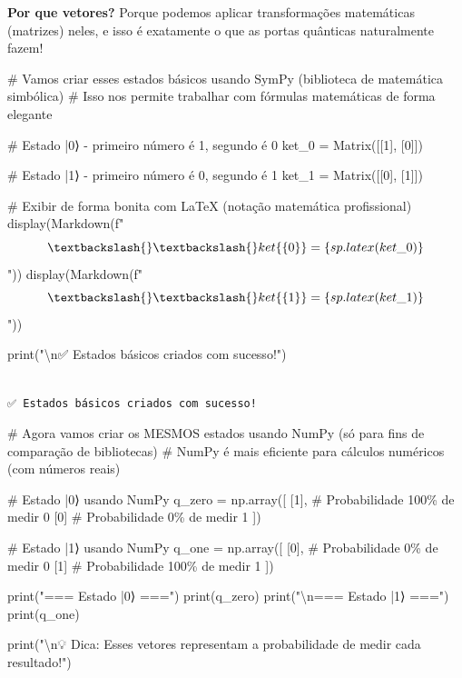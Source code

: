 \documentclass[
  brazilian,
]{report}
\newenvironment{Shaded}{\begin{snugshade}}{\end{snugshade}}
\newcommand{\NormalTok}[1]{\textcolor[rgb]{0.00,0.23,0.31}{#1}}
\begin{document}
\textbf{Por que vetores?} Porque podemos aplicar transformações
matemáticas (matrizes) neles, e isso é exatamente o que as portas
quânticas naturalmente fazem!

\begin{Shaded}
\begin{Highlighting}[]

\NormalTok{\# Vamos criar esses estados básicos usando SymPy (biblioteca de matemática simbólica)}
\NormalTok{\# Isso nos permite trabalhar com fórmulas matemáticas de forma elegante}

\NormalTok{\# Estado |0⟩ {-} primeiro número é 1, segundo é 0}
\NormalTok{ket\_0 = Matrix([[1], }
\NormalTok{                [0]])}

\NormalTok{\# Estado |1⟩ {-} primeiro número é 0, segundo é 1}
\NormalTok{ket\_1 = Matrix([[0], }
\NormalTok{                [1]])}

\NormalTok{\# Exibir de forma bonita com LaTeX (notação matemática profissional)}
\NormalTok{display(Markdown(f"$$\textbackslash{}\textbackslash{}ket\{\{0\}\} = \{sp.latex(ket\_0)\}$$"))}
\NormalTok{display(Markdown(f"$$\textbackslash{}\textbackslash{}ket\{\{1\}\} = \{sp.latex(ket\_1)\}$$"))}

\NormalTok{print("\textbackslash{}n✅ Estados básicos criados com sucesso!")}
\end{Highlighting}
\end{Shaded}

\begin{verbatim}

✅ Estados básicos criados com sucesso!
\end{verbatim}

\begin{Shaded}
\begin{Highlighting}[]

\NormalTok{\# Agora vamos criar os MESMOS estados usando NumPy (só para fins de comparação de bibliotecas)}
\NormalTok{\# NumPy é mais eficiente para cálculos numéricos (com números reais)}

\NormalTok{\# Estado |0⟩ usando NumPy}
\NormalTok{q\_zero = np.array([}
\NormalTok{    [1],   \# Probabilidade 100\% de medir 0}
\NormalTok{    [0]    \# Probabilidade 0\% de medir 1}
\NormalTok{])}

\NormalTok{\# Estado |1⟩ usando NumPy}
\NormalTok{q\_one = np.array([}
\NormalTok{    [0],   \# Probabilidade 0\% de medir 0}
\NormalTok{    [1]    \# Probabilidade 100\% de medir 1}
\NormalTok{])}

\NormalTok{print("=== Estado |0⟩ ===")}
\NormalTok{print(q\_zero)}
\NormalTok{print("\textbackslash{}n=== Estado |1⟩ ===")}
\NormalTok{print(q\_one)}

\NormalTok{print("\textbackslash{}n💡 Dica: Esses vetores representam a \textquotesingle{}probabilidade\textquotesingle{} de medir cada resultado!")}
\end{Highlighting}
\end{Shaded}
\end{document}
